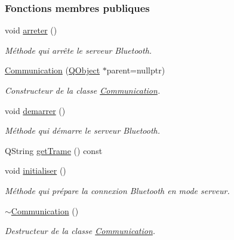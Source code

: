 \subsubsection*{Fonctions membres publiques}
\begin{DoxyCompactItemize}
\item 
void \hyperlink{class_communication_a1f4b02441803f9c8e231cb9f304d776b}{arreter} ()
\begin{DoxyCompactList}\small\item\em Méthode qui arrête le serveur Bluetooth. \end{DoxyCompactList}\item 
\hyperlink{class_communication_a56cf4b262e592bcae1d987c3dd00487f}{Communication} (\hyperlink{class_q_object}{Q\+Object} $\ast$parent=nullptr)
\begin{DoxyCompactList}\small\item\em Constructeur de la classe \hyperlink{class_communication}{Communication}. \end{DoxyCompactList}\item 
void \hyperlink{class_communication_af29ea9a1c2ce29436f2331c322f6ebbf}{demarrer} ()
\begin{DoxyCompactList}\small\item\em Méthode qui démarre le serveur Bluetooth. \end{DoxyCompactList}\item 
Q\+String \hyperlink{class_communication_ad8dbd75b168bc02c76306361e650bbba}{get\+Trame} () const
\item 
void \hyperlink{class_communication_a2c10a52807bc7bdc520ec3fae622f672}{initialiser} ()
\begin{DoxyCompactList}\small\item\em Méthode qui prépare la connexion Bluetooth en mode serveur. \end{DoxyCompactList}\item 
\hyperlink{class_communication_a75ba08ce908d45251e28e4c1db94e6f4}{$\sim$\+Communication} ()
\begin{DoxyCompactList}\small\item\em Destructeur de la classe \hyperlink{class_communication}{Communication}. \end{DoxyCompactList}\end{DoxyCompactItemize}
